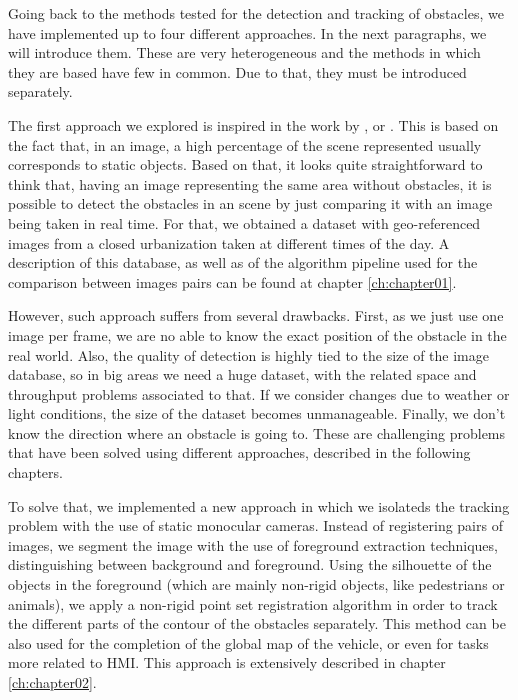 Going back to the methods tested for the detection and tracking of obstacles, we have implemented up to four different approaches. In the next paragraphs, we will introduce them. These are very heterogeneous and the methods in which they are based have few in common. Due to that, they must be introduced separately.

The first approach we explored is inspired in the work by \cite{primdahl2005change},  \cite{diego2011video} or \cite{vallespi2012prior}. This is based on the fact that, in an image, a high percentage of the scene represented usually corresponds to static objects. Based on that, it looks quite straightforward to think that, having an image representing the same area without obstacles, it is possible to detect the obstacles in an scene by just comparing it with an image being taken in real time. For that, we obtained a dataset with geo-referenced images from a closed urbanization taken at different times of the day. A description of this database, as well as of the algorithm pipeline used for the comparison between images pairs can be found at chapter \ref{ch:chapter01}.

However, such approach suffers from several drawbacks. First, as we just use one image per frame, we are no able to know the exact position of the obstacle in the real world. Also, the quality of detection is highly tied to the size of the image database, so in big areas we need a huge dataset, with the related space and throughput problems associated to that. If we consider changes due to weather or light conditions, the size of the dataset becomes unmanageable. Finally, we don't know the direction where an obstacle is going to. These are challenging problems that have been solved using different approaches, described in the following chapters.

To solve that, we implemented a new approach in which we isolateds the tracking problem with the use of static monocular cameras. Instead of registering pairs of images, we segment the image with the use of foreground extraction techniques, distinguishing between background and foreground. Using the silhouette of the objects in the foreground (which are mainly non-rigid objects, like pedestrians or animals), we apply a non-rigid point set registration algorithm in order to track the different parts of the contour of the obstacles separately. This method can be also used for the completion of the global map of the vehicle, or even for tasks more related to \ac{HMI}. This approach is extensively described in chapter \ref{ch:chapter02}.


